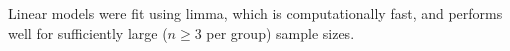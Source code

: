 Linear models were fit using limma\autocite{ritchie2015LimmaPowersDifferential}, which is computationally fast, and performs well for sufficiently large ($n \ge 3$ per group) sample sizes\autocite{soneson2013ComparisonMethodsDifferential}.
